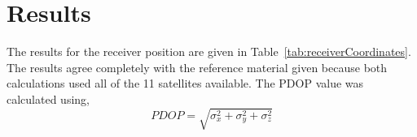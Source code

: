 \section{Results} %
\label{sec:results}

The results for the receiver position are given in Table~\ref{tab:receiverCoordinates}.  The results agree completely with the reference material given because both calculations used all of the 11 satellites available.  The PDOP value was calculated using,
\begin{equation*}
	PDOP = \sqrt{\sigma_x^2 + \sigma_y^2 + \sigma_z^2}
\end{equation*}

